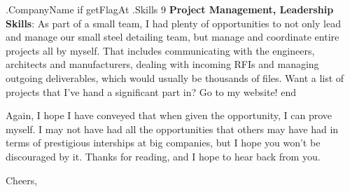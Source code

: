 \documentclass[10pt]{letter}
\begin{document}
\begin{letter}{
    {{ .CompanyName }}
}
{{ if getFlagAt .Skills 9 }}
\textbf{Project Management, Leadership Skills}: As part of a small team, I had plenty of opportunities to not only lead and manage our small steel detailing team, but manage and coordinate entire projects all by myself. That includes communicating with the engineers, architects and manufacturers, dealing with incoming RFIs and managing outgoing deliverables, which would usually be thousands of files. Want a list of projects that I've hand a significant part in? Go to my website!
{{ end }}

Again, I hope I have conveyed that when given the opportunity, I can prove myself. I may not have had all the opportunities that others may have had in terms of prestigious interships at big companies, but I hope you won't be discouraged by it. Thanks for reading, and I hope to hear back from you. 


\closing{Cheers,}

\end{letter}
\end{document}
